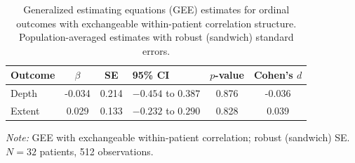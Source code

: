 \begin{table}[htbp]
\centering
\caption{Generalized estimating equations (GEE) estimates for ordinal outcomes with exchangeable within-patient correlation structure. Population-averaged estimates with robust (sandwich) standard errors.}
\label{tab:gee-ordinal}
\begin{tabular}{l S[table-format=-1.3] S[table-format=1.3] l S[table-format=1.3] S[table-format=-1.3]}
\toprule
{Outcome} & {$\beta$} & {SE} & {95\% CI} & {$p$-value} & {Cohen's $d$} \\
\midrule
Depth  & -0.034 & 0.214 & $-0.454$ to $0.387$ & 0.876 & -0.036 \\
Extent &  0.029 & 0.133 & $-0.232$ to $0.290$ & 0.828 &  0.039 \\
\bottomrule
\end{tabular}
\smallskip

\noindent\textit{Note:} GEE with exchangeable within-patient correlation; robust (sandwich) SE. $N = 32$ patients, 512 observations.
\end{table}
